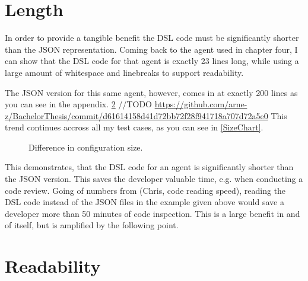 \section{Length}

In order to provide a tangible benefit the DSL code must be significantly shorter than the JSON representation. Coming back to the agent used in chapter four, I can show that the DSL code for that agent is exactly 23 lines long, while using a large amount of whitespace and linebreaks to support readability.

The JSON version for this same agent, however, comes in at exactly 200 lines as you can see in the appendix. \ref{} //TODO \url{https://github.com/arne-z/BachelorThesis/commit/d61614158d41d72bb72f28f941718a707d72a5e0}
This trend continues accross all my test cases, as you can see in \autoref{SizeChart}.
\begin{figure}
    \centering
    
    \caption{Difference in configuration size.}
    \label{SizeChart}
    
\end{figure}
This demonstrates, that the DSL code for an agent is significantly shorter than the JSON version. This saves the developer valuable time, e.g. when conducting a code review. Going of numbers from \citeNeeded (Chris, code reading speed), reading the DSL code instead of the JSON files in the example given above would save a developer more than 50 minutes of code inspection. This is a large benefit in and of itself, but is amplified by the following point.

\section{Readability}

